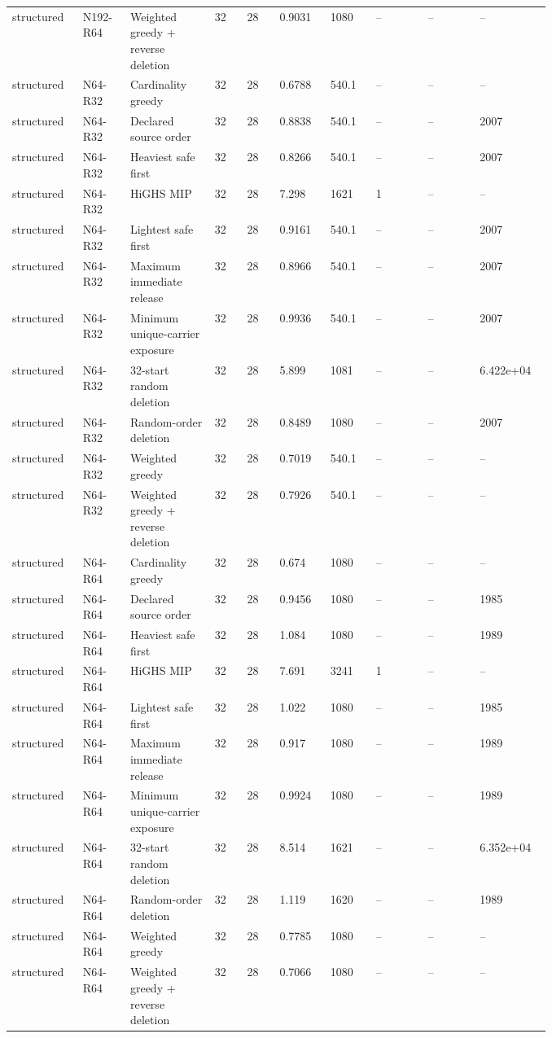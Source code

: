 {\begin{longtable}{p{0.07\linewidth}p{0.06\linewidth}p{0.13\linewidth}p{0.055\linewidth}p{0.055\linewidth}p{0.075\linewidth}p{0.075\linewidth}p{0.085\linewidth}p{0.085\linewidth}p{0.085\linewidth}}
structured & N192-R64 & Weighted greedy + reverse deletion & 32 & 28 & 0.9031 & 1080 & -- & -- & -- \\
structured & N64-R32 & Cardinality greedy & 32 & 28 & 0.6788 & 540.1 & -- & -- & -- \\
structured & N64-R32 & Declared source order & 32 & 28 & 0.8838 & 540.1 & -- & -- & 2007 \\
structured & N64-R32 & Heaviest safe first & 32 & 28 & 0.8266 & 540.1 & -- & -- & 2007 \\
structured & N64-R32 & HiGHS MIP & 32 & 28 & 7.298 & 1621 & 1 & -- & -- \\
structured & N64-R32 & Lightest safe first & 32 & 28 & 0.9161 & 540.1 & -- & -- & 2007 \\
structured & N64-R32 & Maximum immediate release & 32 & 28 & 0.8966 & 540.1 & -- & -- & 2007 \\
structured & N64-R32 & Minimum unique-carrier exposure & 32 & 28 & 0.9936 & 540.1 & -- & -- & 2007 \\
structured & N64-R32 & 32-start random deletion & 32 & 28 & 5.899 & 1081 & -- & -- & 6.422e+04 \\
structured & N64-R32 & Random-order deletion & 32 & 28 & 0.8489 & 1080 & -- & -- & 2007 \\
structured & N64-R32 & Weighted greedy & 32 & 28 & 0.7019 & 540.1 & -- & -- & -- \\
structured & N64-R32 & Weighted greedy + reverse deletion & 32 & 28 & 0.7926 & 540.1 & -- & -- & -- \\
structured & N64-R64 & Cardinality greedy & 32 & 28 & 0.674 & 1080 & -- & -- & -- \\
structured & N64-R64 & Declared source order & 32 & 28 & 0.9456 & 1080 & -- & -- & 1985 \\
structured & N64-R64 & Heaviest safe first & 32 & 28 & 1.084 & 1080 & -- & -- & 1989 \\
structured & N64-R64 & HiGHS MIP & 32 & 28 & 7.691 & 3241 & 1 & -- & -- \\
structured & N64-R64 & Lightest safe first & 32 & 28 & 1.022 & 1080 & -- & -- & 1985 \\
structured & N64-R64 & Maximum immediate release & 32 & 28 & 0.917 & 1080 & -- & -- & 1989 \\
structured & N64-R64 & Minimum unique-carrier exposure & 32 & 28 & 0.9924 & 1080 & -- & -- & 1989 \\
structured & N64-R64 & 32-start random deletion & 32 & 28 & 8.514 & 1621 & -- & -- & 6.352e+04 \\
structured & N64-R64 & Random-order deletion & 32 & 28 & 1.119 & 1620 & -- & -- & 1989 \\
structured & N64-R64 & Weighted greedy & 32 & 28 & 0.7785 & 1080 & -- & -- & -- \\
structured & N64-R64 & Weighted greedy + reverse deletion & 32 & 28 & 0.7066 & 1080 & -- & -- & -- \\
\bottomrule
\end{longtable}
}
